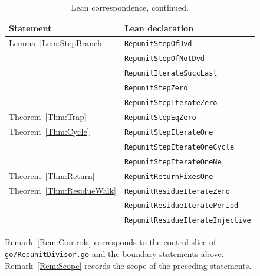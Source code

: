 \documentclass[11pt,letterpaper]{article}
\begin{document}
\begin{table}[htbp]
\centering
\begin{tabular}{ll}
\toprule
Statement & Lean declaration \\
\midrule
Lemma~\ref{Lem:StepBranch} & \texttt{RepunitStepOfDvd} \\
 & \texttt{RepunitStepOfNotDvd} \\
 & \texttt{RepunitIterateSuccLast} \\
 & \texttt{RepunitStepZero} \\
 & \texttt{RepunitStepIterateZero} \\
Theorem~\ref{Thm:Trap} & \texttt{RepunitStepEqZero} \\
Theorem~\ref{Thm:Cycle} & \texttt{RepunitStepIterateOne} \\
 & \texttt{RepunitStepIterateOneCycle} \\
 & \texttt{RepunitStepIterateOneNe} \\
Theorem~\ref{Thm:Return} & \texttt{RepunitReturnFixesOne} \\
Theorem~\ref{Thm:ResidueWalk} & \texttt{RepunitResidueIterateZero} \\
 & \texttt{RepunitResidueIteratePeriod} \\
 & \texttt{RepunitResidueIterateInjective} \\
\bottomrule
\end{tabular}
\caption{Lean correspondence, continued.}
\end{table}

Remark~\ref{Rem:Controls} corresponds to the control slice of
\texttt{go/RepunitDivisor.go} and the boundary statements above.
Remark~\ref{Rem:Scope} records the scope of the preceding statements.
\end{document}
